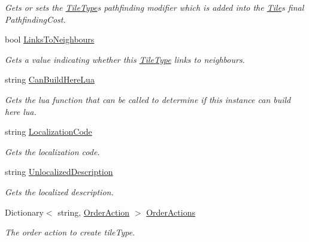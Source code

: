 \begin{DoxyCompactItemize}
\begin{DoxyCompactList}\small\item\em Gets or sets the \hyperlink{class_tile_type}{Tile\+Type}\textquotesingle{}s pathfinding modifier which is added into the \hyperlink{class_tile}{Tile}\textquotesingle{}s final Pathfinding\+Cost. \end{DoxyCompactList}\item 
bool \hyperlink{class_tile_type_af93d2a77c5ac943fe763b8e0dfed6360}{Links\+To\+Neighbours}
\begin{DoxyCompactList}\small\item\em Gets a value indicating whether this \hyperlink{class_tile_type}{Tile\+Type} links to neighbours. \end{DoxyCompactList}\item 
string \hyperlink{class_tile_type_a4a0ffcd58093d3a5c9b085f9a69707f7}{Can\+Build\+Here\+Lua}
\begin{DoxyCompactList}\small\item\em Gets the lua function that can be called to determine if this instance can build here lua. \end{DoxyCompactList}\item 
string \hyperlink{class_tile_type_aec98b27159318d4f3132015f1a367f00}{Localization\+Code}
\begin{DoxyCompactList}\small\item\em Gets the localization code. \end{DoxyCompactList}\item 
string \hyperlink{class_tile_type_afb617b11992631ba7862acacbd5daee2}{Unlocalized\+Description}
\begin{DoxyCompactList}\small\item\em Gets the localized description. \end{DoxyCompactList}\item 
Dictionary$<$ string, \hyperlink{class_project_porcupine_1_1_order_actions_1_1_order_action}{Order\+Action} $>$ \hyperlink{class_tile_type_af41afc0dfba859d0a1a1449c95579d04}{Order\+Actions}
\begin{DoxyCompactList}\small\item\em The order action to create tile\+Type. \end{DoxyCompactList}\end{DoxyCompactItemize}


